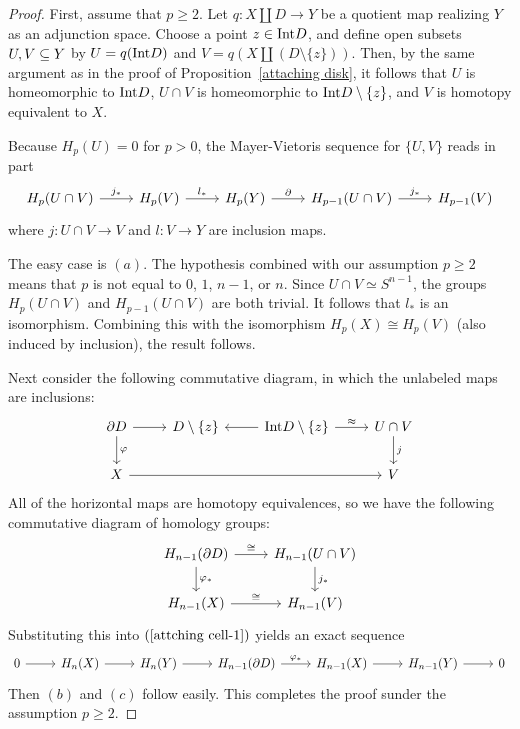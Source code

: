 \begin{proof}
First, assume that $p\geq2$. Let $q:X\amalg D\to Y$ be a quotient map realizing $Y$ as an adjunction space. Choose a point $z\in\mathrm{Int} D$, and define open subsets $U,V\subseteq Y$ by $U=q(\mathrm{Int} D)$ and $V=q(X\amalg(D\setminus\{z\}))$. Then, by the same argument as in the proof of Proposition~\ref{attaching disk}, it follows that $U$ is homeomorphic to $\mathrm{Int} D$, $U\cap V$ is homeomorphic to $\mathrm{Int} D\setminus\{z\}$, and $V$ is homotopy equivalent to $X$.\par
Because $H_p(U)=0$ for $p>0$, the Mayer-Vietoris sequence for $\{U,V\}$ reads in part
\begin{equation}\label{attching cell-1}
\begin{tikzcd}
H_p(U\cap V)\ar[r,"j_*"]&H_p(V)\ar[r,"l_*"]&H_p(Y)\ar[r,"\partial"]&H_{p-1}(U\cap V)\ar[r,"j_*"]&H_{p-1}(V)
\end{tikzcd}
\end{equation}
where $j:U\cap V\to V$ and $l:V\to Y$ are inclusion maps.\par
The easy case is $(a)$. The hypothesis combined with our assumption $p\geq2$ means that $p$ is not equal to $0$, $1$, $n-1$, or $n$. Since $U\cap V\simeq S^{n-1}$, the 
groups $H_p(U\cap V)$ and $H_{p-1}(U\cap V)$ are both trivial. It follows that $l_*$ is an isomorphism. Combining this with the isomorphism $H_p(X)\cong H_p(V)$ (also 
induced by inclusion), the result follows.\par
Next consider the following commutative diagram, in which the unlabeled maps are inclusions:
\[\begin{tikzcd}
\partial D\ar[d,"\varphi"]\ar[r]&D\setminus\{z\}&\Int D\setminus\{z\}\ar[l]\ar[r,"\approx"]&U\cap V\ar[d,"j"]\\
X\ar[rrr]&&&V
\end{tikzcd}\]
All of the horizontal maps are homotopy equivalences, so we have the following commutative diagram of homology groups:
\[\begin{tikzcd}
H_{n-1}(\partial D)\ar[d,"\varphi_*"]\ar[r,"\cong"]&H_{n-1}(U\cap V)\ar[d,"j_*"]\\
H_{n-1}(X)\ar[r,"\cong"]&H_{n-1}(V)
\end{tikzcd}\]
Substituting this into $(\ref{attching cell-1})$ yields an exact sequence
\[\begin{tikzcd}
0\ar[r]&H_n(X)\ar[r]&H_n(Y)\ar[r]&H_{n-1}(\partial D)\ar[r,"\varphi_*"]&H_{n-1}(X)\ar[r]&H_{n-1}(Y)\ar[r]&0
\end{tikzcd}\]
Then $(b)$ and $(c)$ follow easily. This completes the proof sunder the assumption $p\geq2$.\par

\end{proof}
